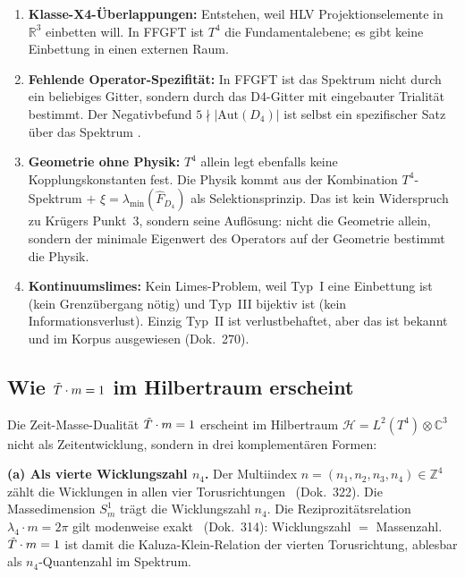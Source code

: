 \begin{enumerate}
  \item \textbf{Klasse-X4-Überlappungen:}
    Entstehen, weil HLV Projektionselemente in $\mathbb{R}^3$ einbetten
    will. In FFGFT ist $T^4$ die Fundamentalebene; es gibt keine
    Einbettung in einen externen Raum.

  \item \textbf{Fehlende Operator-Spezifität:}
    In FFGFT ist das Spektrum nicht durch ein beliebiges Gitter,
    sondern durch das D4-Gitter mit eingebauter Trialität bestimmt.
    Der Negativbefund $5 \nmid |\text{Aut}(D_4)|$ ist selbst ein
    spezifischer Satz über das Spektrum \K.

  \item \textbf{Geometrie ohne Physik:}
    $T^4$ allein legt ebenfalls keine Kopplungskonstanten fest.
    Die Physik kommt aus der Kombination $T^4$-Spektrum $+$
    $\xi = \lambda_{\min}(\hat{F}_{D_4})$ als Selektionsprinzip.
    Das ist kein Widerspruch zu Krügers Punkt~3, sondern seine
    Auflösung: nicht die Geometrie allein, sondern der
    minimale Eigenwert des Operators auf der Geometrie bestimmt die Physik.

  \item \textbf{Kontinuumslimes:}
    Kein Limes-Problem, weil Typ~I eine Einbettung ist (kein
    Grenzübergang nötig) und Typ~III bijektiv ist (kein Informationsverlust).
    Einzig Typ~II ist verlustbehaftet, aber das ist bekannt und
    im Korpus ausgewiesen (Dok.~270).
\end{enumerate}

\subsection{Wie $\tilde{T}\cdot m = 1$ im Hilbertraum erscheint \K}
\label{sec:dualitaet-hilbert}

Die Zeit-Masse-Dualität $\tilde{T}\cdot m = 1$ erscheint im Hilbertraum
$\mathcal{H} = L^2(T^4)\otimes\mathbb{C}^3$ nicht als Zeitentwicklung,
sondern in drei komplementären Formen:

\textbf{(a) Als vierte Wicklungszahl $n_4$.}
Der Multiindex $n = (n_1,n_2,n_3,n_4)\in\mathbb{Z}^4$ zählt die
Wicklungen in allen vier Torusrichtungen \B\ (Dok.~322).
Die Massedimension $S^1_m$ trägt die Wicklungszahl $n_4$.
Die Reziprozitätsrelation $\lambda_4\cdot m = 2\pi$ gilt modenweise
exakt \K\ (Dok.~314): Wicklungszahl $=$ Massenzahl.
$\tilde{T}\cdot m = 1$ ist damit die Kaluza-Klein-Relation der
vierten Torusrichtung, ablesbar als $n_4$-Quantenzahl im Spektrum.

